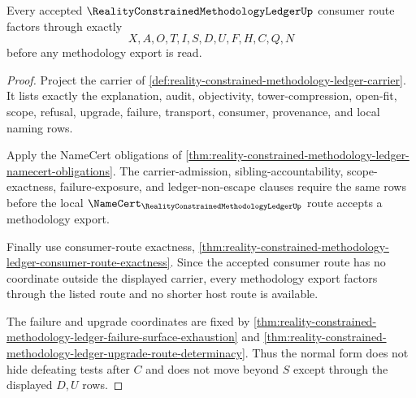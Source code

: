 \begin{theorem}
\label{thm:reality-constrained-methodology-ledger-route-normal-form}
Every accepted $\RealityConstrainedMethodologyLedgerUp$ consumer route factors
through exactly
$$
X,A,O,T,I,S,D,U,F,H,C,Q,N
$$
before any methodology export is read.
\end{theorem}
\begin{proof}
Project the carrier of
\autoref{def:reality-constrained-methodology-ledger-carrier}. It lists exactly
the explanation, audit, objectivity, tower-compression, open-fit, scope,
refusal, upgrade, failure, transport, consumer, provenance, and local naming
rows.

Apply the NameCert obligations of
\autoref{thm:reality-constrained-methodology-ledger-namecert-obligations}. The
carrier-admission, sibling-accountability, scope-exactness, failure-exposure,
and ledger-non-escape clauses require the same rows before the local
$\NameCert_{\RealityConstrainedMethodologyLedgerUp}$ route accepts a methodology
export.

Finally use consumer-route exactness,
\autoref{thm:reality-constrained-methodology-ledger-consumer-route-exactness}.
Since the accepted consumer route has no coordinate outside the displayed
carrier, every methodology export factors through the listed route and no
shorter host route is available.

The failure and upgrade coordinates are fixed by
\autoref{thm:reality-constrained-methodology-ledger-failure-surface-exhaustion}
and
\autoref{thm:reality-constrained-methodology-ledger-upgrade-route-determinacy}.
Thus the normal form does not hide defeating tests after $C$ and does not move
beyond $S$ except through the displayed $D,U$ rows.
\end{proof}
